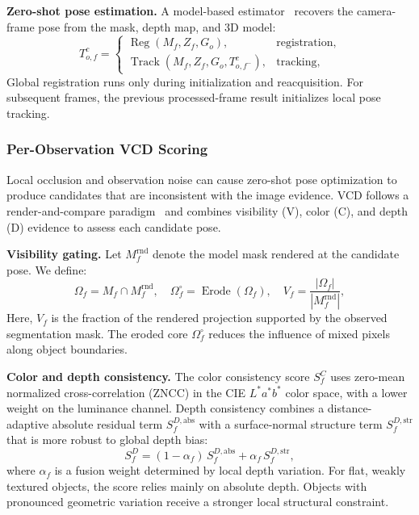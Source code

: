 \documentclass[review]{vgtc}
\begin{document}
\textbf{Zero-shot pose estimation.}
A model-based estimator~\cite{foundationpose2024} recovers the camera-frame pose from the mask, depth map, and 3D model:
\begin{equation}
T_{o,f}^{c} =
\begin{cases}
\operatorname{Reg}(M_f, Z_f, G_o), & \text{registration}, \\
\operatorname{Track}(M_f, Z_f, G_o, T_{o,f^-}^{c}), & \text{tracking},
\end{cases}
\label{eq:pose}
\end{equation}
Global registration runs only during initialization and reacquisition. For subsequent frames, the previous processed-frame result initializes local pose tracking.

\subsubsection{Per-Observation VCD Scoring}

Local occlusion and observation noise can cause zero-shot pose optimization to produce candidates that are inconsistent with the image evidence. VCD follows a render-and-compare paradigm~\cite{deepim2018,latentfusion2020,focalpose2022} and combines visibility (V), color (C), and depth (D) evidence to assess each candidate pose.

\textbf{Visibility gating.}
Let $M_f^{\mathrm{rnd}}$ denote the model mask rendered at the candidate pose. We define:
\begin{equation}
\Omega_f = M_f \cap M_f^{\mathrm{rnd}}, \quad \Omega_f^{\circ} = \operatorname{Erode}(\Omega_f), \quad V_f = \frac{|\Omega_f|}{|M_f^{\mathrm{rnd}}|},
\label{eq:visibility}
\end{equation}
Here, $V_f$ is the fraction of the rendered projection supported by the observed segmentation mask. The eroded core $\Omega_f^\circ$ reduces the influence of mixed pixels along object boundaries.

\textbf{Color and depth consistency.}
The color consistency score $S_f^C$ uses zero-mean normalized cross-correlation (ZNCC) in the CIE $L^*a^*b^*$ color space, with a lower weight on the luminance channel. Depth consistency combines a distance-adaptive absolute residual term $S_f^{D,\mathrm{abs}}$ with a surface-normal structure term $S_f^{D,\mathrm{str}}$ that is more robust to global depth bias:
\begin{equation}
S_f^D = (1-\alpha_f)\,S_f^{D,\mathrm{abs}} + \alpha_f\,S_f^{D,\mathrm{str}},
\label{eq:depth-score}
\end{equation}
where $\alpha_f$ is a fusion weight determined by local depth variation. For flat, weakly textured objects, the score relies mainly on absolute depth. Objects with pronounced geometric variation receive a stronger local structural constraint.
\end{document}
